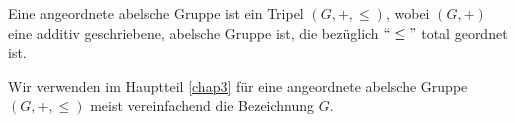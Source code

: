 
%
\begin{defn} %
Eine angeordnete abelsche Gruppe ist ein Tripel $\left(G, +, \leq\right)$, wobei $\left(G, +\right)$ eine additiv geschriebene, abelsche Gruppe ist, die bezüglich $``\leq "$ total geordnet ist.
\end{defn}
%
%
%
%
\begin{nota}
Wir verwenden im Hauptteil \ref{chap3} für eine angeordnete abelsche Gruppe $\left(G, +, \leq\right)$ meist vereinfachend die Bezeichnung $G$.
\end{nota}

